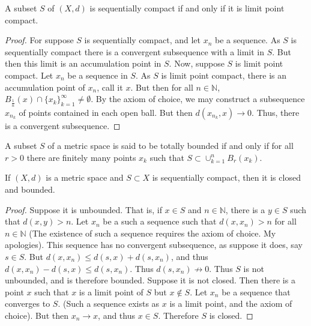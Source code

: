 \documentclass[crop=false,class=book,oneside]{standalone}
\begin{document}
            \begin{theorem}
            A subset $S$ of $(X,d)$ is sequentially compact if and only if it is limit point compact.
            \end{theorem}
            \begin{proof}
            For suppose $S$ is sequentially compact, and let $x_n$ be a sequence. As $S$ is sequentially compact there is a convergent subsequence with a limit in $S$. But then this limit is an accumulation point in $S$. Now, suppose $S$ is limit point compact. Let $x_n$ be a sequence in $S$. As $S$ is limit point compact, there is an accumulation point of $x_n$, call it $x$. But then for all $n\in \mathbb{N}$, $B_{\frac{1}{n}}(x)\cap \{x_k\}_{k=1}^{\infty}\ne \emptyset$. By the axiom of choice, we may construct a subsequence $x_{n_k}$ of points contained in each open ball. But then $d(x_{n_k},x)\rightarrow 0$. Thus, there is a convergent subsequence.
            \end{proof}
            \begin{definition}
            A subset $S$ of a metric space is said to be totally bounded if and only if for all $r>0$ there are finitely many points $x_k$ such that $S\subset \cup_{k=1}^{n} B_{r}(x_k)$.
            \end{definition}
            \begin{theorem}
            If $(X,d)$ is a metric space and $S\subset X$ is sequentially compact, then it is closed and bounded.
            \end{theorem}
            \begin{proof}
            \item Suppose it is unbounded. That is, if $x\in S$ and $n\in \mathbb{N}$, there is a $y\in S$ such that $d(x,y)>n$. Let $x_n$ be a such a sequence such that $d(x,x_n)>n$ for all $n\in \mathbb{N}$ (The existence of such a sequence requires the axiom of choice. My apologies). This sequence has no convergent subsequence, as suppose it does, say $s\in S$. But $d(x,x_n) \leq d(s,x)+d(s,x_n)$, and thus $d(x,x_n)-d(s,x)\leq d(s,x_n)$. Thus $d(s,x_n) \not\rightarrow 0$. Thus $S$ is not unbounded, and is therefore bounded. Suppose it is not closed. Then there is a point $x$ such that $x$ is a limit point of $S$ but $x\notin S$. Let $x_n$ be a sequence that converges to $S$. (Such a sequence exists as $x$ is a limit point, and the axiom of choice). But then $x_n \rightarrow x$, and thus $x\in S$. Therefore $S$ is closed.
            \end{proof}
\end{document}
